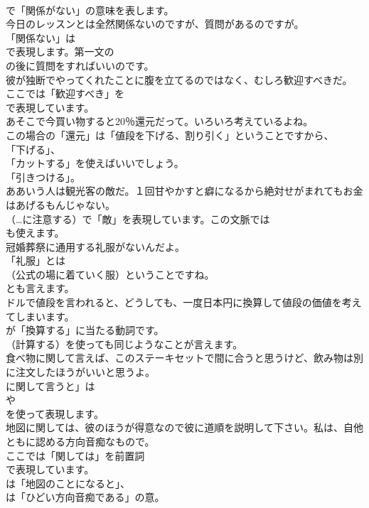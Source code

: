 \documentclass[8pt]{extreport}
\begin{document}
\begin{CJK}{UTF8}{min}
\\	で「関係がない」の意味を表します。	
\\	今日のレッスンとは全然関係ないのですが、質問があるのですが。 
\\	「関係ない」は
\\	で表現します。第一文の
\\	の後に質問をすればいいのです。	
\\	彼が独断でやってくれたことに腹を立てるのではなく、むしろ歓迎すべきだ。 
\\	ここでは「歓迎すべき」を 
\\	で表現しています。	
\\	あそこで今買い物すると20％還元だって。いろいろ考えているよね。 
\\	この場合の「還元」は「値段を下げる、割り引く」ということですから、
\\	「下げる」、
\\	「カットする」を使えばいいでしょう。
\\	「引きつける」。	
\\	ああいう人は観光客の敵だ。１回甘やかすと癖になるから絶対せがまれてもお金はあげるもんじゃない。 
\\	（…に注意する）で「敵」を表現しています。この文脈では 
\\	も使えます。	
\\	冠婚葬祭に通用する礼服がないんだよ。 
\\	「礼服」とは
\\	（公式の場に着ていく服）ということですね。
\\	とも言えます。	
\\	ドルで値段を言われると、どうしても、一度日本円に換算して値段の価値を考えてしまいます。 
\\	が「換算する」に当たる動詞です。
\\	（計算する）を使っても同じようなことが言えます。	
\\	食べ物に関して言えば、このステーキセットで間に合うと思うけど、飲み物は別に注文したほうがいいと思うよ。 
\\	に関して言うと」は
\\	や
\\	を使って表現します。	
\\	地図に関しては、彼のほうが得意なので彼に道順を説明して下さい。私は、自他ともに認める方向音痴なもので。 
\\	ここでは「関しては」を前置詞 
\\	で表現しています。
\\	は「地図のことになると」、
\\	は「ひどい方向音痴である」の意。	

\end{CJK}
\end{document}
